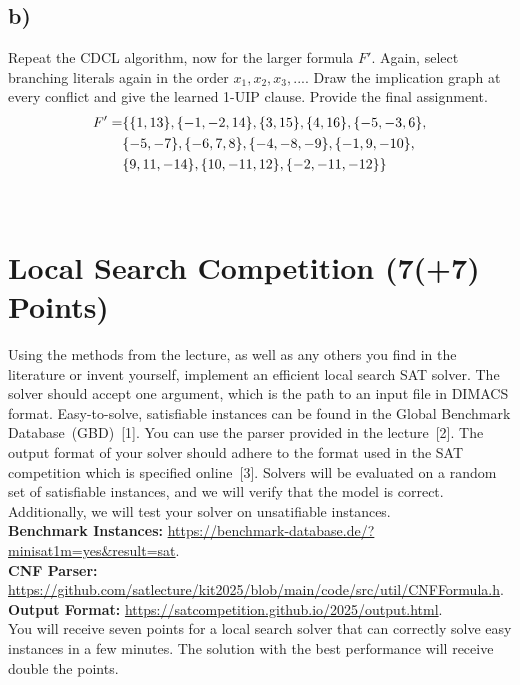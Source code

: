 \documentclass[a4paper]{article}
\begin{document}
\subsection{b)}
Repeat the CDCL algorithm, now for the larger formula $F'$. Again, select branching literals again in the order $x_1,x_2,x_3, ...$. Draw the implication graph at every conflict and give the learned 1-UIP clause. Provide the final assignment.
\begin{align}
	\centering
	F' = &\{\{1, 13\}, \{-1, -2, 14\}, \{3, 15\}, \{4, 16\},\{-5, -3, 6\},  \notag \\
	\quad & \{-5, -7\}, \{-6, 7, 8\}, \{-4, -8, -9\}, \{-1, 9, -10\},\notag \\
	\quad & \{9, 11, -14\}, \{10, -11, 12\}, \{-2, -11, -12\}\}
\end{align}

~\\[1em]
\section{Local Search Competition (7(+7) Points)}

Using the methods from the lecture, as well as any others you find in the literature or invent yourself, implement an efficient local search SAT solver.
The solver should accept one argument, which is the path to an input file in DIMACS format.
Easy-to-solve, satisfiable instances can be found in the Global Benchmark Database~(GBD)~[1].
You can use the parser provided in the lecture~[2].
The output format of your solver should adhere to the format used in the SAT competition which is specified online~[3].
Solvers will be evaluated on a random set of satisfiable instances, and we will verify that the model is correct.
Additionally, we will test your solver on unsatifiable instances.~\\[1em]

\noindent
[1] \textbf{Benchmark Instances:} \url{https://benchmark-database.de/?minisat1m=yes&result=sat}.\\[1ex]
\noindent
[2] \textbf{CNF Parser:} \url{https://github.com/satlecture/kit2025/blob/main/code/src/util/CNFFormula.h}.\\[1ex]
\noindent
[3] \textbf{Output Format:} \url{https://satcompetition.github.io/2025/output.html}.\\[1em]

\noindent
You will receive seven points for a local search solver that can correctly solve easy instances in a few minutes. The solution with the best performance will receive double the points.
\end{document}
